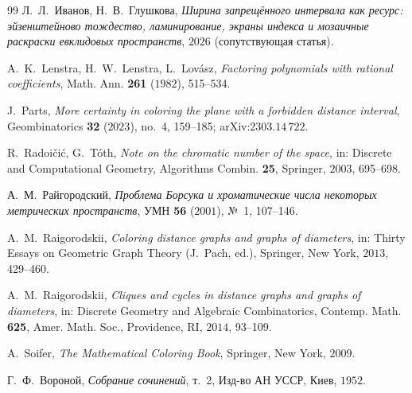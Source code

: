 \documentclass[11pt]{article}
\theoremstyle{definition}
\theoremstyle{remark}
\begin{document}
\begin{thebibliography}{99}
 Л.~Л.~Иванов, Н.~В.~Глушкова,
\emph{Ширина запрещённого интервала как ресурс: эйзенштейново тождество,
ламинирование, экраны индекса и мозаичные раскраски евклидовых пространств},
$2026$ (сопутствующая статья).

 A.~K.~Lenstra, H.~W.~Lenstra, L.~Lov\'asz,
\emph{Factoring polynomials with rational coefficients},
Math. Ann. \textbf{261} ($1982$), 515--534.

 J.~Parts,
\emph{More certainty in coloring the plane with a forbidden distance
interval},
Geombinatorics \textbf{32} ($2023$), no.~4, 159--185; arXiv:$2303$.$14\,722$.

 R.~Radoi\v{c}i\'c, G.~T\'oth,
\emph{Note on the chromatic number of the space},
in: Discrete and Computational Geometry, Algorithms Combin. \textbf{25},
Springer, $2003$, 695--698.

 А.~М.~Райгородский,
\emph{Проблема Борсука и хроматические числа некоторых метрических
пространств}, УМН \textbf{56} ($2001$), №~1, 107--146.

 A.~M.~Raigorodskii,
\emph{Coloring distance graphs and graphs of diameters}, in: Thirty Essays on
Geometric Graph Theory (J.~Pach, ed.), Springer, New York, $2013$, 429--460.

 A.~M.~Raigorodskii,
\emph{Cliques and cycles in distance graphs and graphs of diameters}, in:
Discrete Geometry and Algebraic Combinatorics, Contemp. Math. \textbf{625},
Amer. Math. Soc., Providence, RI, $2014$, 93--109.

 A.~Soifer,
\emph{The Mathematical Coloring Book}, Springer, New York, $2009$.

 Г.~Ф.~Вороной,
\emph{Собрание сочинений}, т.~2, Изд-во АН УССР, Киев, $1952$.

\end{thebibliography}
\end{document}
